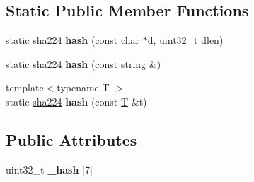 \subsection*{Static Public Member Functions}
\begin{DoxyCompactItemize}
\item 
\mbox{\label{classfc_1_1sha224_a106602f08c6b5eb0dff90a14ccbadb7d}} 
static \mbox{\hyperlink{classfc_1_1sha224}{sha224}} {\bfseries hash} (const char $\ast$d, uint32\+\_\+t dlen)
\item 
\mbox{\label{classfc_1_1sha224_a0cefea377edc4ebbd1fe1b3a3749ead0}} 
static \mbox{\hyperlink{classfc_1_1sha224}{sha224}} {\bfseries hash} (const string \&)
\item 
\mbox{\label{classfc_1_1sha224_a0347723d57a0e9c04548f9c50273e5f0}} 
{\footnotesize template$<$typename T $>$ }\\static \mbox{\hyperlink{classfc_1_1sha224}{sha224}} {\bfseries hash} (const \mbox{\hyperlink{struct_t}{T}} \&t)
\end{DoxyCompactItemize}
\subsection*{Public Attributes}
\begin{DoxyCompactItemize}
\item 
\mbox{\label{classfc_1_1sha224_a7c8a0942bc9a546efc14065259376c5d}} 
uint32\+\_\+t {\bfseries \+\_\+hash} \mbox{[}7\mbox{]}
\end{DoxyCompactItemize}
